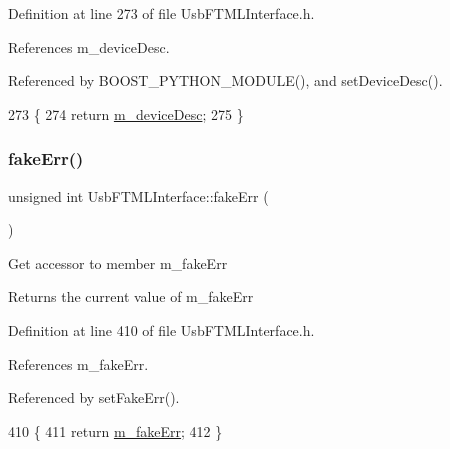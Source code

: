 Definition at line 273 of file Usb\+F\+T\+M\+L\+Interface.\+h.



References m\+\_\+device\+Desc.



Referenced by B\+O\+O\+S\+T\+\_\+\+P\+Y\+T\+H\+O\+N\+\_\+\+M\+O\+D\+U\+L\+E(), and set\+Device\+Desc().


\begin{DoxyCode}
273                           \{
274     \textcolor{keywordflow}{return} \hyperlink{classUsbFTMLInterface_a15063a6d03335ec8988e41eb61a1ab9f}{m\_deviceDesc};
275   \}
\end{DoxyCode}
\mbox{\label{classUsbFTMLInterface_a0379dd75800521cea37580d68205f620}} 
\subsubsection{\texorpdfstring{fake\+Err()}{fakeErr()}}
{\footnotesize\ttfamily unsigned int Usb\+F\+T\+M\+L\+Interface\+::fake\+Err (\begin{DoxyParamCaption}{ }\end{DoxyParamCaption})\hspace{0.3cm}{\ttfamily [inline]}}

Get accessor to member m\+\_\+fake\+Err \begin{DoxyReturn}{Returns}
the current value of m\+\_\+fake\+Err 
\end{DoxyReturn}


Definition at line 410 of file Usb\+F\+T\+M\+L\+Interface.\+h.



References m\+\_\+fake\+Err.



Referenced by set\+Fake\+Err().


\begin{DoxyCode}
410                           \{
411     \textcolor{keywordflow}{return} \hyperlink{classUsbFTMLInterface_a35c84586c9aae7555b56481d636338e8}{m\_fakeErr};
412   \}
\end{DoxyCode}
\mbox{\label{classUsbFTMLInterface_a1cfe65c58531afc07c21d876e21d8e46}} 
